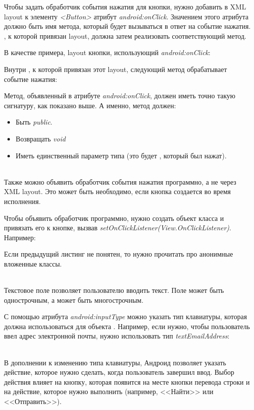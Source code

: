 Чтобы задать обработчик события нажатия для кнопки, нужно добавить в XML layout
к элементу \textit{<Button>} атрибут \textit{android:onClick}. Значением этого
атрибута должно быть имя метода, который будет вызываться в ответ на событие
нажатия. \Activity, к которой привязан layout, должна затем реализовать
соответствующий метод.

В качестве примера, layout кнопки, использующий \textit{android:onClick}:

Внутри \Activity, к которой привязан этот layout, следующий метод обрабатывает
событие нажатия:

Метод, объявленный в атрибуте \textit{android:onClick}, должен иметь точно
такую сигнатуру, как показано выше. А именно, метод должен:
\begin{itemize}
  \item Быть \textit{public}.
  
  \item Возвращать \textit{void}
  
  \item Иметь единственный параметр типа \View (это будет \View, который был
  нажат).
\end{itemize}

\\
Также можно объявить обработчик события нажатия программно, а не через XML
layout. Это может быть необходимо, если кнопка создается во время исполнения.

Чтобы объявить обработчик программно, нужно создать объект класса
\OnClickListener и привязать его к кнопке, вызвав
\textit{setOnClickListener(View.OnClickListener)}. Например:

Если предыдущий листинг не понятен, то нужно прочитать про анонимные вложенные
классы.

\\
Текстовое поле позволяет пользователю вводить текст. Поле может быть
однострочным, а может быть многострочным. 

С помощью атрибута \textit{android:inputType} можно указать тип клавиатуры,
которая должна использоваться для объекта \EditText. Например, если нужно,
чтобы пользователь ввел адрес электронной почты, нужно использовать тип
\textit{textEmailAddress}:

\\
В дополнении к изменению типа клавиатуры, Андроид позволяет указать действие,
которое нужно сделать, когда пользователь завершил ввод. Выбор действия влияет
на кнопку, которая появится на месте кнопки перевода строки и на действие,
которое нужно выполнить (например, <<Найти>> или <<Отправить>>).

